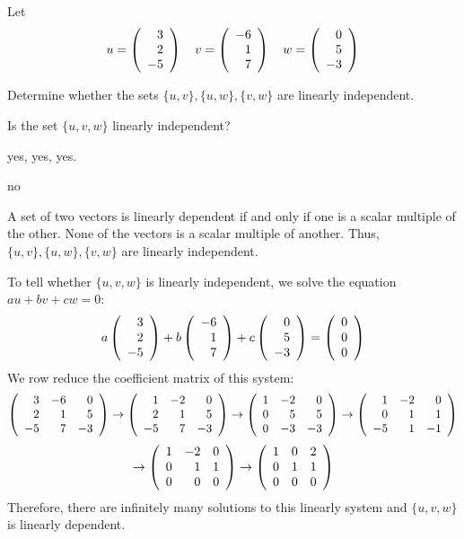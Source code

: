 \documentclass{ximera}
\author{Marty Golubitsky}
\begin{document}
\begin{exercise}\label{C5.4.10}
 Let 
 \[
 u = \left(\begin{array}{rrrrrrrrrrrrrrrrrr} 3\\2\\-5 \end{array}\right) \quad v = \left(\begin{array}{rrrrrrrrrrrrrrrrrr} -6\\1\\7 \end{array}\right) \quad w = \left(\begin{array}{rrrrrrrrrrrrrrrrrr} 0\\5\\-3 \end{array}\right)
 \]
\begin{enumeratea}
\item Determine whether the sets $\{u,v\}, \{u,w\}, \{v,w\}$ are linearly independent.
\item Is the set $\{u,v,w\}$ linearly independent? 
\end{enumeratea}

  
\begin{solution}

\ans %
\begin{enumeratea}
\item yes, yes, yes.
\item no
\end{enumeratea}

\soln %

\begin{enumeratea}
\item A set of two vectors is linearly dependent if and only if one is a scalar multiple of the other.  None of the vectors is a scalar multiple of another. Thus, $\{u,v\}, \{u,w\}, \{v,w\}$ are linearly independent.
\item To tell whether $\{u,v,w\}$ is linearly independent, we solve the equation $au + bv + cw = 0$:
\[ 
a \left(\begin{array}{rrrrrrrrrrrrrrrrrr} 3 \\ 2 \\ -5 \end{array}\right) + b\left(\begin{array}{rrrrrrrrrrrrrrrrrr} -6\\1\\7 \end{array}\right) + c\left(\begin{array}{rrrrrrrrrrrrrrrrrr} 0\\5\\-3 \end{array}\right) = \left(\begin{array}{rrrrrrrrrrrrrrrrrr} 0\\0\\0 \end{array}\right)
\]
We row reduce the coefficient matrix of this system: 
\[ 
\left(\begin{array}{rrrrrrrrrrrrrrrrrr}  3 & -6 & 0 \\ 2 & 1 & 5 \\ -5 & 7 & -3  \end{array}\right) \to \left(\begin{array}{rrrrrrrrrrrrrrrrrr}  1 & -2 & 0 \\ 2 & 1 & 5 \\ -5 & 7 & -3  \end{array}\right)  \to \left(\begin{array}{rrrrrrrrrrrrrrrrrr}  1 & -2 & 0 \\ 0 & 5 & 5 \\ 0 & -3 & -3  \end{array}\right) \to\left(\begin{array}{rrrrrrrrrrrrrrrrrr}  1 & -2 & 0 \\ 0 & 1 & 1 \\ -5 & 1 & -1  \end{array}\right) \] \[ \to \left(\begin{array}{rrrrrrrrrrrrrrrrrr}  1 & -2 & 0 \\ 0 & 1 & 1 \\ 0 & 0 & 0  \end{array}\right) \to  \left(\begin{array}{rrrrrrrrrrrrrrrrrr}  1 & 0 & 2 \\ 0 & 1 & 1 \\ 0 & 0 & 0  \end{array}\right) 
\]
Therefore, there are infinitely many solutions to this linearly system and $\{u,v,w\}$ is linearly dependent.


\end{enumeratea}
\end{solution}
\end{exercise}
\end{document}
